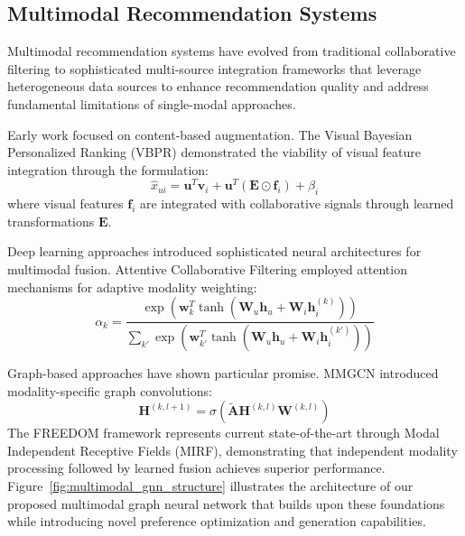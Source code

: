 \documentclass[pdflatex,sn-mathphys-num]{sn-jnl}%
\theoremstyle{thmstyleone}%
\theoremstyle{thmstyletwo}%
\theoremstyle{thmstylethree}%
\begin{document}
\subsection{Multimodal Recommendation Systems}

Multimodal recommendation systems have evolved from traditional collaborative filtering to sophisticated multi-source integration frameworks that leverage heterogeneous data sources to enhance recommendation quality and address fundamental limitations of single-modal approaches.

Early work focused on content-based augmentation. The Visual Bayesian Personalized Ranking (VBPR) \cite{mcauley2015image} demonstrated the viability of visual feature integration through the formulation:
\begin{equation}
\hat{x}_{ui} = \mathbf{u}^T \mathbf{v}_i + \mathbf{u}^T (\mathbf{E} \odot \mathbf{f}_i) + \beta_i
\end{equation}
where visual features $\mathbf{f}_i$ are integrated with collaborative signals through learned transformations $\mathbf{E}$.

Deep learning approaches introduced sophisticated neural architectures for multimodal fusion. Attentive Collaborative Filtering \cite{chen2017attentive} employed attention mechanisms for adaptive modality weighting:
\begin{equation}
\alpha_{k} = \frac{\exp(\mathbf{w}_k^T \tanh(\mathbf{W}_u \mathbf{h}_u + \mathbf{W}_i \mathbf{h}_i^{(k)}))}{\sum_{k'} \exp(\mathbf{w}_{k'}^T \tanh(\mathbf{W}_u \mathbf{h}_u + \mathbf{W}_i \mathbf{h}_i^{(k')}))}
\end{equation}

Graph-based approaches have shown particular promise. MMGCN \cite{wei2019mmgcn} introduced modality-specific graph convolutions:
\begin{equation}
\mathbf{H}^{(k,l+1)} = \sigma(\tilde{\mathbf{A}} \mathbf{H}^{(k,l)} \mathbf{W}^{(k,l)})
\end{equation}
The FREEDOM framework \cite{wei2022freedom} represents current state-of-the-art through Modal Independent Receptive Fields (MIRF), demonstrating that independent modality processing followed by learned fusion achieves superior performance. Figure~\ref{fig:multimodal_gnn_structure} illustrates the architecture of our proposed multimodal graph neural network that builds upon these foundations while introducing novel preference optimization and generation capabilities.
\end{document}
